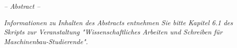 \begin{center}
	\onehalfspacing
\begin{minipage}[c][\textheight][c]{0.7\textwidth}
    \begin{center} \textit{\Large{-- Abstract --}} \end{center}
    \textit{Informationen zu Inhalten des Abstracts entnehmen Sie bitte Kapitel 6.1 des Skripts zur Veranstaltung "Wissenschaftliches Arbeiten und Schreiben für Maschinenbau-Studierende".}
    
    \textit{\blindtext}
\end{minipage}
\end{center}